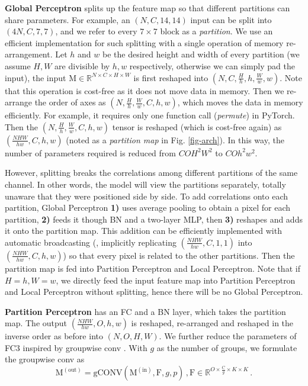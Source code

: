 \documentclass[10pt,twocolumn,letterpaper]{article}
\begin{document}
\textbf{Global Perceptron} splits up the feature map so that different partitions can share parameters. For example, an $(N,C,14,14)$ input can be split into $(4N,C,7,7)$, and we refer to every $7\times7$ block as a \textit{partition}. We use an efficient implementation for such splitting with a single operation of memory re-arrangement. Let $h$ and $w$ be the desired height and width of every partition (we assume $H,W$ are divisible by $h,w$ respectively, otherwise we can simply pad the input), the input $\mathrm{M}\in\mathbb{R}^{N\times C\times H\times W}$ is first reshaped into $(N, C, \frac{H}{h}, h, \frac{W}{w}, w)$. Note that this operation is cost-free as it does not move data in memory. Then we re-arrange the order of axes as $(N,\frac{H}{h}, \frac{W}{w}, C, h, w)$, which moves the data in memory efficiently. For example, it requires only one function call (\textit{permute}) in PyTorch. Then the $(N,\frac{H}{h}, \frac{W}{w}, C, h, w)$ tensor is reshaped (which is cost-free again) as $(\frac{NHW}{hw}, C, h, w)$ (noted as a \textit{partition map} in Fig. \ref{fig-arch}). In this way, the number of parameters required is reduced from $COH^2W^2$ to $COh^2w^2$.

However, splitting breaks the correlations among different partitions of the same channel. In other words, the model will view the partitions separately, totally unaware that they were positioned side by side. To add correlations onto each partition, Global Perceptron \textbf{1)} uses average pooling to obtain a pixel for each partition, \textbf{2)} feeds it though BN and a two-layer MLP, then \textbf{3)} reshapes and adds it onto the partition map. This addition can be efficiently implemented with automatic broadcasting (\ie, implicitly replicating $(\frac{NHW}{hw},C,1,1)$ into $(\frac{NHW}{hw},C,h,w)$) so that every pixel is related to the other partitions. Then the partition map is fed into Partition Perceptron and Local Perceptron. Note that if $H=h,W=w$, we directly feed the input feature map into Partition Perceptron and Local Perceptron without splitting, hence there will be no Global Perceptron.


\textbf{Partition Perceptron} has an FC and a BN layer, which takes the partition map. The output $(\frac{NHW}{hw}, O, h, w)$ is reshaped, re-arranged and reshaped in the inverse order as before into $(N, O, H, W)$. We further reduce the parameters of FC3 inspired by groupwise conv \cite{chollet2017xception,xie2017aggregated}. With $g$ as the number of groups, we formulate the groupwise conv as
\begin{equation}
\mathrm{M}^{(\text{out})} = \text{gCONV}(\mathrm{M}^{(\text{in})}, \mathrm{F}, g, p) \,, \mathrm{F}\in\mathbb{R}^{O\times \frac{C}{g} \times K\times K} \,.
\end{equation}
\end{document}
